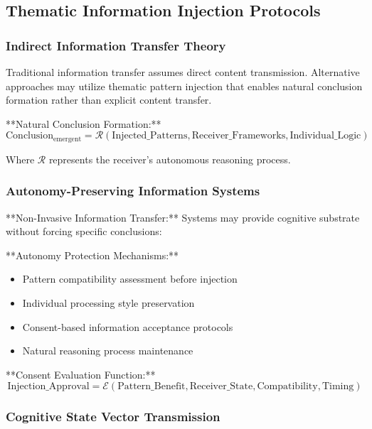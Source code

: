 \documentclass[12pt,a4paper]{article}
\begin{document}
\subsection{Thematic Information Injection Protocols}

\subsubsection{Indirect Information Transfer Theory}

Traditional information transfer assumes direct content transmission. Alternative approaches may utilize thematic pattern injection that enables natural conclusion formation rather than explicit content transfer.

**Natural Conclusion Formation:**
\begin{equation}
\text{Conclusion}_{\text{emergent}} = \mathcal{R}(\text{Injected\_Patterns}, \text{Receiver\_Frameworks}, \text{Individual\_Logic})
\label{eq:natural_conclusion}
\end{equation}

Where $\mathcal{R}$ represents the receiver's autonomous reasoning process.

\subsubsection{Autonomy-Preserving Information Systems}

**Non-Invasive Information Transfer:** Systems may provide cognitive substrate without forcing specific conclusions:

**Autonomy Protection Mechanisms:**
\begin{itemize}
\item Pattern compatibility assessment before injection
\item Individual processing style preservation
\item Consent-based information acceptance protocols
\item Natural reasoning process maintenance
\end{itemize}

**Consent Evaluation Function:**
\begin{equation}
\text{Injection\_Approval} = \mathcal{E}(\text{Pattern\_Benefit}, \text{Receiver\_State}, \text{Compatibility}, \text{Timing})
\label{eq:consent_evaluation}
\end{equation}

\subsubsection{Cognitive State Vector Transmission}
\end{document}
